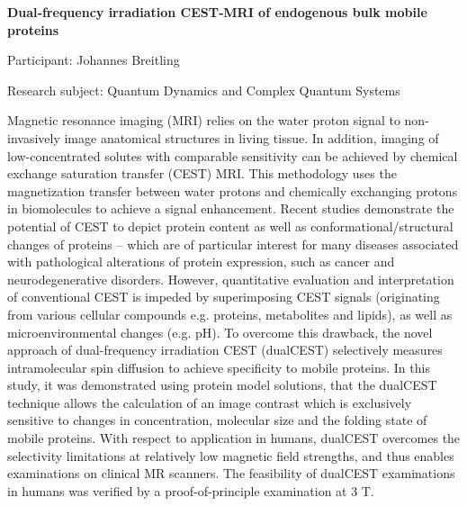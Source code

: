 \begin{minipage}[t]{1.0\textwidth}

\begin{center}

{{\large\bfseries Dual‐frequency irradiation CEST‐MRI of endogenous bulk mobile proteins}\par}

\end{center}

{\noindent Participant: Johannes Breitling\par} 

{\noindent Research subject: Quantum Dynamics and Complex Quantum Systems\par}\medskip

\noindent Magnetic resonance imaging (MRI) relies on the water proton signal to non-invasively image anatomical structures in living tissue. In addition, imaging of low-concentrated solutes with comparable sensitivity can be achieved by chemical exchange saturation transfer (CEST) MRI. This methodology uses the magnetization transfer between water protons and chemically exchanging protons in biomolecules to achieve a signal enhancement. Recent studies demonstrate the potential of CEST to depict protein content as well as conformational/structural changes of proteins – which are of particular interest for many diseases associated with pathological alterations of protein expression, such as cancer and neurodegenerative disorders.
However, quantitative evaluation and interpretation of conventional CEST is impeded by superimposing CEST signals (originating from various cellular compounds e.g. proteins, metabolites and lipids), as well as microenvironmental changes (e.g. pH). To overcome this drawback, the novel approach of dual-frequency irradiation CEST (dualCEST) selectively measures intramolecular spin diffusion to achieve specificity to mobile proteins.
In this study, it was demonstrated using protein model solutions, that the dualCEST technique allows the calculation of an image contrast which is exclusively sensitive to changes in concentration, molecular size and the folding state of mobile proteins. With respect to application in humans, dualCEST overcomes the selectivity limitations at relatively low magnetic field strengths, and thus enables examinations on clinical MR scanners. The feasibility of dualCEST examinations in humans was verified by a proof-of-principle examination at 3 T.
\par\end{minipage}

